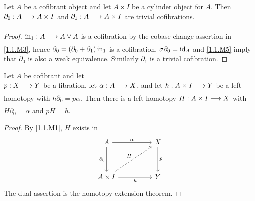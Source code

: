 \documentclass[../main]{subfiles}
\begin{document}
\begin{lemma}\label{lem:1.1.2}
	Let $A$ be a cofibrant object and let $A\times I$ be a cylinder object for $A$. Then \newline $\partial_0:A\varrightarrow{}A\times I$ and $\partial_1:A\varrightarrow{}A\times I$ are trivial cofibrations.
\end{lemma}

\begin{proof}
	$\In_1:A\varrightarrow{}A\vee A$ is a cofibration by the cobase change assertion in \ref{1.1.M3}, hence $\partial_0=(\partial_0+\partial_1)\operatorname{in}_1$ is a cofibration. $\sigma \partial_0=\operatorname{id}_A$ and \ref{1.1.M5} imply that $\partial_0$ is also a weak equivalence. Similarly $\partial_1$ is a trivial cofibration.
\end{proof}

\begin{corollary*}\label{cor:1.1.1} 
	Let $A$ be cofibrant and let \\$p:X\varrightarrow{}Y$ be a fibration, let $\alpha:A\varrightarrow{}X$, and let $h:A\times I\varrightarrow{}Y$ be a left homotopy with $h\partial_0=p\alpha$. Then there is a left homotopy $H:A\times I\varrightarrow{} X$ with $H\partial_0=\alpha$ and $pH=h$.
\end{corollary*}

\begin{proof}
	By \ref{1.1.M1}, $H$ exists in
    \[\begin{tikzcd}
	A && X \\
	\\
	{A\times I} && Y
	\arrow["{\partial_0}"', from=1-1, to=3-1]
	\arrow["\alpha", from=1-1, to=1-3]
	\arrow["h"', from=3-1, to=3-3]
	\arrow["p", from=1-3, to=3-3]
	\arrow["H", dashed, from=3-1, to=1-3]
    \end{tikzcd}\]
	The dual assertion is the homotopy extension theorem.
\end{proof}
\end{document}
